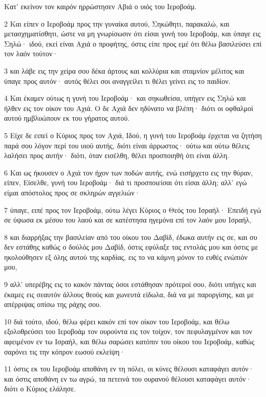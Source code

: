 \par Κατ' εκείνον τον καιρόν ηρρώστησεν Αβιά ο υιός του Ιεροβοάμ.
\par 2 Και είπεν ο Ιεροβοάμ προς την γυναίκα αυτού, Σηκώθητι, παρακαλώ, και μετασχηματίσθητι, ώστε να μη γνωρίσωσιν ότι είσαι γυνή του Ιεροβοάμ, και ύπαγε εις Σηλώ· ιδού, εκεί είναι Αχιά ο προφήτης, όστις είπε προς εμέ ότι θέλω βασιλεύσει επί τον λαόν τούτον·
\par 3 και λάβε εις την χείρα σου δέκα άρτους και κολλύρια και σταμνίον μέλιτος και ύπαγε προς αυτόν· αυτός θέλει σοι αναγγείλει τι θέλει γείνει εις το παιδίον.
\par 4 Και έκαμεν ούτως η γυνή του Ιεροβοάμ· και σηκωθείσα, υπήγεν εις Σηλώ και ήλθεν εις τον οίκον του Αχιά. Ο δε Αχιά δεν ηδύνατο να βλέπη· διότι οι οφθαλμοί αυτού ημβλυώπουν εκ του γήρατος αυτού.
\par 5 Είχε δε ειπεί ο Κύριος προς τον Αχιά, Ιδού, η γυνή του Ιεροβοάμ έρχεται να ζητήση παρά σου λόγον περί του υιού αυτής, διότι είναι άρρωστος· ούτω και ούτω θέλεις λαλήσει προς αυτήν· διότι, όταν εισέλθη, θέλει προσποιηθή ότι είναι άλλη.
\par 6 Και ως ήκουσεν ο Αχιά τον ήχον των ποδών αυτής, ενώ εισήρχετο εις την θύραν, είπεν, Είσελθε, γυνή του Ιεροβοάμ· διά τι προσποιείσαι ότι είσαι άλλη; αλλ' εγώ είμαι απόστολος προς σε σκληρών αγγελιών·
\par 7 ύπαγε, ειπέ προς τον Ιεροβοάμ, ούτω λέγει Κύριος ο Θεός του Ισραήλ· Επειδή εγώ σε ύψωσα εκ μέσου του λαού και σε κατέστησα ηγεμόνα επί τον λαόν μου Ισραήλ,
\par 8 και διαρρήξας την βασιλείαν από του οίκου του Δαβίδ, έδωκα αυτήν εις σε, και συ δεν εστάθης καθώς ο δούλός μου Δαβίδ, όστις εφύλαξε τας εντολάς μου και όστις με ηκολούθησεν εξ όλης αυτού της καρδίας, εις το να κάμνη μόνον το ευθές ενώπιόν μου,
\par 9 αλλ' υπερέβης εις το κακόν πάντας όσοι εστάθησαν πρότεροί σου, διότι υπήγες και έκαμες εις σεαυτόν άλλους θεούς και χωνευτά είδωλα, διά να με παροργίσης, και με απέρριψας οπίσω της ράχης σου.
\par 10 διά τούτο, ιδού, θέλω φέρει κακόν επί τον οίκον του Ιεροβοάμ, και θέλω εξολοθρεύσει του Ιεροβοάμ τον ουρούντα εις τον τοίχον, τον πεφυλαγμένον και τον αφειμένον εν τω Ισραήλ, και θέλω σαρώσει κατόπιν του οίκου του Ιεροβοάμ, καθώς σαρόνει τις την κόπρον εωσού εκλείψη·
\par 11 όστις εκ του Ιεροβοάμ αποθάνη εν τη πόλει, οι κύνες θέλουσι καταφάγει αυτόν· και όστις αποθάνη εν τω αγρώ, τα πετεινά του ουρανού θέλουσι καταφάγει αυτόν· διότι ο Κύριος ελάλησε.
